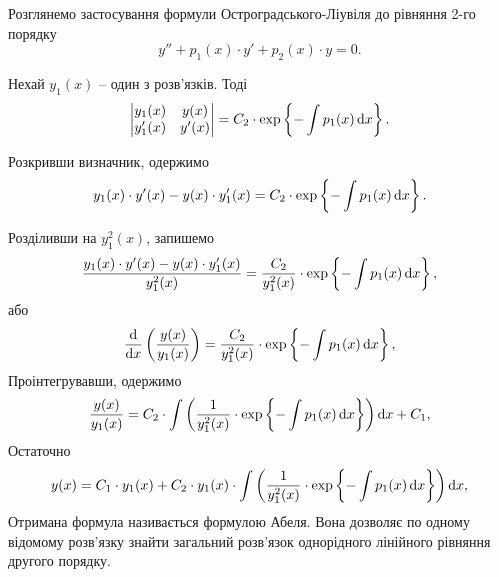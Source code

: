 Розглянемо застосування формули Остроградського-Ліувіля до рівняння 2-го порядку
\begin{equation*}
	y'' + p_1(x) \cdot y' + p_2(x) \cdot y = 0.
\end{equation*}

Нехай $y_1(x)$ -- один з розв’язків. Тоді
\begin{equation*}
	\begin{vmatrix}
		y_1(x) & y(x) \\
		y_1'(x) & y'(x)
	\end{vmatrix} = C_2 \cdot \exp \left\{ - \int p_1(x) \mathop{}\!\mathrm{d} x \right\}.
\end{equation*}

Розкривши визначник, одержимо
\begin{equation*}
	y_1(x) \cdot y'(x) - y(x) \cdot y_1'(x) = C_2 \cdot \exp \left\{ - \int p_1(x) \mathop{}\!\mathrm{d} x \right\}.
\end{equation*}
 
Розділивши на $y_1^2(x)$, запишемо
\begin{equation*}
	\frac{y_1(x) \cdot y'(x) - y(x) \cdot y_1'(x)}{y_1^2(x)} = \frac{C_2}{y_1^2(x)} \cdot \exp \left\{ - \int p_1(x) \mathop{}\!\mathrm{d} x \right\},
\end{equation*}
або
\begin{equation*}
	\frac{\mathop{}\!\mathrm{d}}{\mathop{}\!\mathrm{d} x} \left( \frac{y(x)}{y_1(x)} \right) = \frac{C_2}{y_1^2(x)} \cdot \exp \left\{ - \int p_1(x) \mathop{}\!\mathrm{d} x \right\},
\end{equation*}
Проінтегрувавши, одержимо
\begin{equation*}
	\frac{y(x)}{y_1(x)} = C_2 \cdot \int \left( \frac{1}{y_1^2(x)} \cdot \exp \left\{ - \int p_1(x) \mathop{}\!\mathrm{d} x \right\} \right) \mathop{}\!\mathrm{d} x + C_1,
\end{equation*}
Остаточно
\begin{equation*}
	y(x) = C_1 \cdot y_1(x) + C_2 \cdot y_1(x) \cdot \int \left( \frac{1}{y_1^2(x)} \cdot \exp \left\{ - \int p_1(x) \mathop{}\!\mathrm{d} x \right\} \right) \mathop{}\!\mathrm{d} x,
\end{equation*}
Отримана формула називається формулою Абеля. Вона дозволяє по одному відомому розв’язку знайти загальний розв’язок однорідного лінійного рівняння другого порядку.
